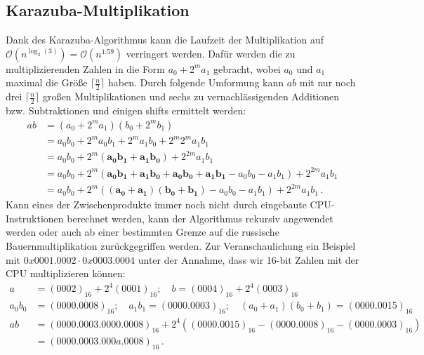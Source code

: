 \documentclass[course=erap]{aspdoc}
\begin{document}
\subsection{Karazuba-Multiplikation}
Dank des Karazuba-Algorithmus kann die Laufzeit der Multiplikation auf $\mathcal{O}(n^{\log_2(3)}) = \mathcal{O}(n^{1.59})$\cite{the_art_of_programming} verringert werden.
Dafür werden die zu multiplizierenden Zahlen in die Form $a_0+2^ma_1$ gebracht, wobei $a_0$ und $a_1$ maximal die Größe $\lceil\frac{n}{2}\rceil$ haben.
Durch folgende Umformung kann $ab$ mit nur noch drei $\lceil\frac{n}{2}\rceil$ großen Multiplikationen und sechs zu vernachlässigenden Additionen bzw. Subtraktionen und einigen shifts ermittelt werden:
\begin{align*}
a b &= (a_0+2^ma_1) (b_0+2^mb_1)\\
      &= a_0b_0 + 2^ma_0b_1 + 2^ma_1b_0 + 2^m2^ma_1b_1\\
      &= a_0b_0 + 2^m(\mathbf{a_0b_1 + a_1b_0}) + 2^{2m}a_1b_1\\
      &= a_0b_0 + 2^m(\mathbf{a_0b_1 + a_1b_0 + a_0b_0 + a_1b_1} - a_0b_0 - a_1b_1) + 2^{2m}a_1b_1\\
      &= a_0b_0 + 2^m(\mathbf{(a_0+a_1)(b_0+b_1)} - a_0b_0 - a_1b_1) + 2^{2m}a_1b_1 \, .
\end{align*}
Kann eines der Zwischenprodukte immer noch nicht durch eingebaute CPU-Instruktionen berechnet werden, kann der Algorithmus rekursiv angewendet werden oder auch ab einer bestimmten Grenze auf die russische Bauernmultiplikation zurückgegriffen werden.
Zur Veranschaulichung ein Beispiel mit $0x0001.0002 \cdot 0x0003.0004$ unter der Annahme, dass wir 16-bit Zahlen mit der CPU multiplizieren können:
\begin{align*}
      a &= (0002)_{16} + 2^4(0001)_{16}; \quad b = (0004)_{16} + 2^4(0003)_{16} \\
      a_0b_0 &= (0000.0008)_{16}; \quad a_1b_1 = (0000.0003)_{16}; \quad (a_0+a_1)(b_0+b_1) = (0000.0015)_{16} \\
      ab &= (0000.0003.0000.0008)_{16} + 2^4((0000.0015)_{16}-(0000.0008)_{16}-(0000.0003)_{16}) \\
      &= (0000.0003.000a.0008)_{16} \, .
\end{align*}
\end{document}
